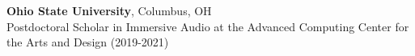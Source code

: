 \textbf{Ohio State University}, Columbus, OH \\
Postdoctoral Scholar in Immersive Audio at the Advanced Computing Center for the Arts and Design (2019-2021)
